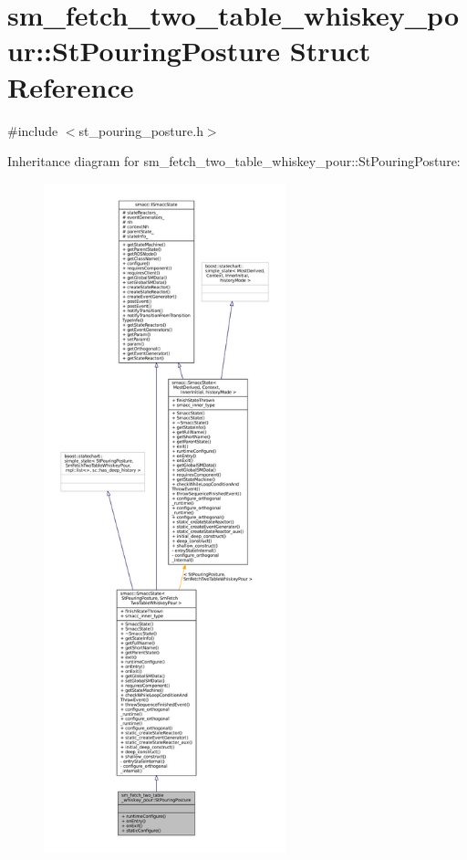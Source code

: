 \hypertarget{structsm__fetch__two__table__whiskey__pour_1_1StPouringPosture}{}\section{sm\+\_\+fetch\+\_\+two\+\_\+table\+\_\+whiskey\+\_\+pour\+:\+:St\+Pouring\+Posture Struct Reference}
\label{structsm__fetch__two__table__whiskey__pour_1_1StPouringPosture}


{\ttfamily \#include $<$st\+\_\+pouring\+\_\+posture.\+h$>$}



Inheritance diagram for sm\+\_\+fetch\+\_\+two\+\_\+table\+\_\+whiskey\+\_\+pour\+:\+:St\+Pouring\+Posture\+:
\nopagebreak
\begin{figure}[H]
\begin{center}
\leavevmode
\includegraphics[height=550pt]{structsm__fetch__two__table__whiskey__pour_1_1StPouringPosture__inherit__graph}
\end{center}
\end{figure}


